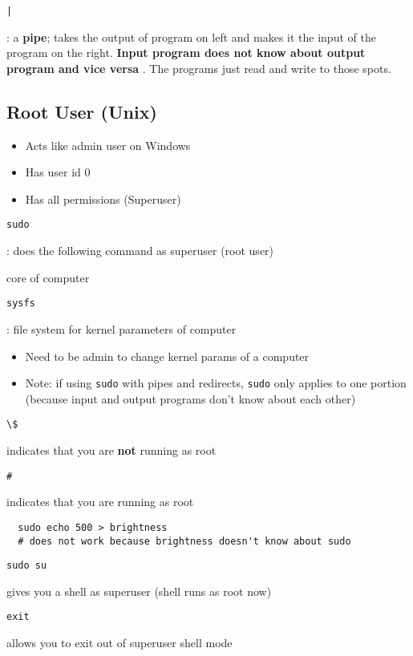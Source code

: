 \documentclass[letterpaper,12pt]{article}
\newcommand*{\lstitem}[1]{
  \setbox0\hbox{\lstinline{#1}}
  \item[\usebox0]
}
\begin{document}
\begin{description}
 \lstitem{|}: a \textbf{pipe}; takes the output of program on left and makes it the input of the program on the right. \textbf{Input program does not know about output program and vice versa} . The programs just read and write to those spots.
\end{description}

\subsection{Root User (Unix)}
\begin{itemize}
 \item Acts like admin user on Windows
 \item Has user id 0
 \item Has all permissions (Superuser)
\end{itemize}

\begin{description}
 \lstitem{sudo}: does the following command as superuser (root user)
 \item[kernel:] core of computer
       \lstitem{sysfs}: file system for kernel parameters of computer
\end{description}

\begin{itemize}
 \item Need to be admin to change kernel params of a computer
 \item Note: if using \lstinline{sudo} with pipes and redirects, \lstinline{sudo} only applies to one portion (because input and output programs don't know about each other)
\end{itemize}

\begin{description}
 \lstitem{\$} indicates that you are \textbf{not} running as root
 \lstitem{#} indicates that you are running as root
\end{description}

\begin{lstlisting}
  sudo echo 500 > brightness
  # does not work because brightness doesn't know about sudo
\end{lstlisting}

\begin{description}
 \lstitem{sudo su} gives you a shell as superuser (shell runs as root now)
 \lstitem{exit} allows you to exit out of superuser shell mode
\end{description}
\end{document}
